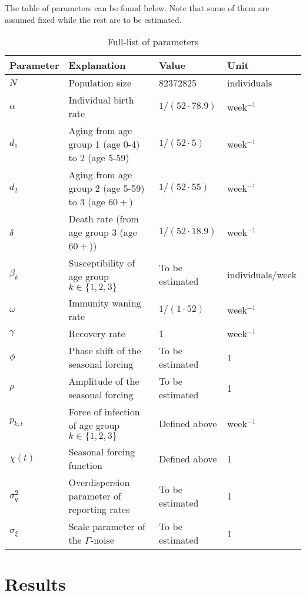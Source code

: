 \documentclass[10pt]{article}
\begin{document}
The table of parameters can be found below. Note that some of them are assumed fixed while the rest are to be estimated.

\begin{table}[H]
\centering
\caption{Full-list of parameters}
\label{tab:para_table}
\begin{tabularx}{\textwidth}{@{}Xlll@{}} %
\toprule
Parameter & Explanation & Value & Unit \\
\midrule
$N$ & Population size & 82372825 & individuals \\
$\alpha$ & Individual birth rate & $1 /(52 \cdot 78.9)$ & week$^{-1}$ \\
$d_1$ & Aging from age group 1 (age 0-4) to 2 (age 5-59) & $1 /(52 \cdot 5)$ & week$^{-1}$ \\
$d_2$ & Aging from age group 2 (age 5-59) to 3 (age $60+$) & $1 /(52 \cdot 55)$ & week$^{-1}$ \\
$\delta$ & Death rate (from age group 3 (age $60+$)) & $1 /(52 \cdot 18.9)$ & week$^{-1}$ \\
$\beta_k$ & Susceptibility of age group $k \in \{1,2,3\}$ & To be estimated & individuals/week \\
$\omega$ & Immunity waning rate & $1 /(1 \cdot 52)$ & week$^{-1}$ \\
$\gamma$ & Recovery rate & 1 & week$^{-1}$ \\
$\phi$ & Phase shift of the seasonal forcing & To be estimated & 1 \\
$\rho$ & Amplitude of the seasonal forcing & To be estimated & 1 \\
$p_{k,t}$ & Force of infection of age group $k \in \{1,2,3\}$ & Defined above & week$^{-1}$ \\
$\chi(t)$ & Seasonal forcing function & Defined above & 1 \\
$\sigma_{q}^2$ & Overdispersion parameter of reporting rates & To be estimated & 1 \\
$\sigma_{\xi}$ & Scale parameter of the $\Gamma$-noise & To be estimated & 1 \\
\bottomrule
\end{tabularx}
\end{table}





\section{Results}
\end{document}
